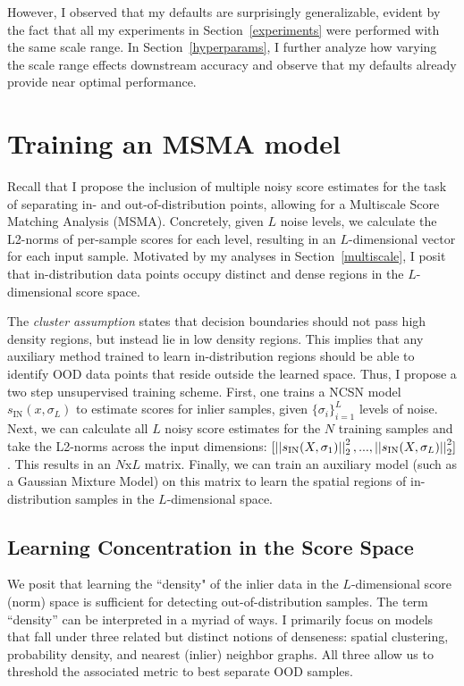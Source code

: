 However, I observed that my defaults are surprisingly generalizable, evident by the fact that all my experiments in Section~\ref{experiments} were performed with the same scale range. In Section~\ref{hyperparams}, I further analyze how varying the scale range effects downstream accuracy and observe that my defaults already provide near optimal performance.


\section{Training an MSMA model}

Recall that I propose the inclusion of multiple noisy score estimates for the task of separating in- and out-of-distribution points, allowing for a Multiscale Score Matching Analysis (MSMA). Concretely, given $L$ noise levels, we calculate the L2-norms of per-sample scores for each level, resulting in an $L$-dimensional vector for each input sample. Motivated by my analyses in Section~\ref{multiscale}, I posit that in-distribution data points occupy distinct and dense regions in the $L$-dimensional score space.

The \textit{cluster assumption} states that decision boundaries should not pass high density regions, but instead lie in low density regions. This implies that any auxiliary method trained to learn in-distribution regions should be able to identify OOD data points that reside outside the learned space. Thus, I propose a two step unsupervised training scheme. First, one trains a NCSN model $s_{\text{IN}}(x, \sigma_L)$ to estimate scores for inlier samples, given $\{\sigma_i\}_{i=1}^L$ levels of noise. Next, we can calculate all $L$ noisy score estimates for the $N$ training samples and take the L2-norms across the input dimensions: $[\left|\left| {  s_{\text{IN}} (X, \sigma_1) } \right|\right|_2^2, ... , \left|\left| {  s_{\text{IN}} (X, \sigma_L) } \right|\right|_2^2 ]$. This results in an $N$x$L$ matrix. Finally, we can train an auxiliary model (such as a Gaussian Mixture Model) on this matrix to learn the spatial regions of in-distribution samples in the $L$-dimensional space.

\subsection*{Learning Concentration in the Score Space}

We posit that learning the ``density" of the inlier data in the $L$-dimensional score (norm) space is sufficient for detecting out-of-distribution samples. The term “density” can be interpreted in a myriad of ways. I primarily focus on models that fall under three related but distinct notions of denseness: spatial clustering, probability density, and nearest (inlier) neighbor graphs. All three allow us to threshold the associated metric to best separate OOD samples.

